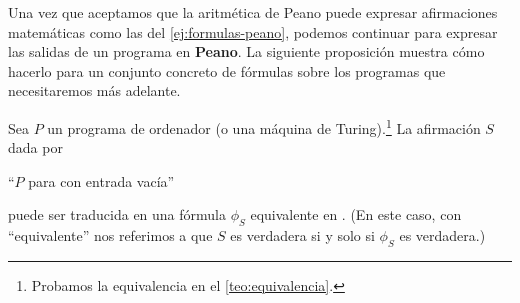 \vspace*{8pt}

Una vez que aceptamos que la aritmética de Peano puede expresar afirmaciones matemáticas como las del \cref{ej:formulas-peano}, podemos continuar para expresar las salidas de un programa en \textbf{Peano}. La siguiente proposición muestra cómo hacerlo para un conjunto concreto de fórmulas sobre los programas que necesitaremos más adelante.

\begin{proposicion}\label{prop:parada-a-peano}
Sea $P$ un programa de ordenador (o una máquina de Turing).\footnote{Probamos la equivalencia en el \cref{teo:equivalencia}.} La afirmación $S$ dada por
\begin{adjustwidth}{30pt}{}
    ``$P$ para con entrada vacía''
\end{adjustwidth}
puede ser traducida en una fórmula $\phi_S$ equivalente en . (En este caso, con ``equivalente'' nos referimos a que $S$ es verdadera si y solo si $\phi_S$ es verdadera.)
\end{proposicion}
